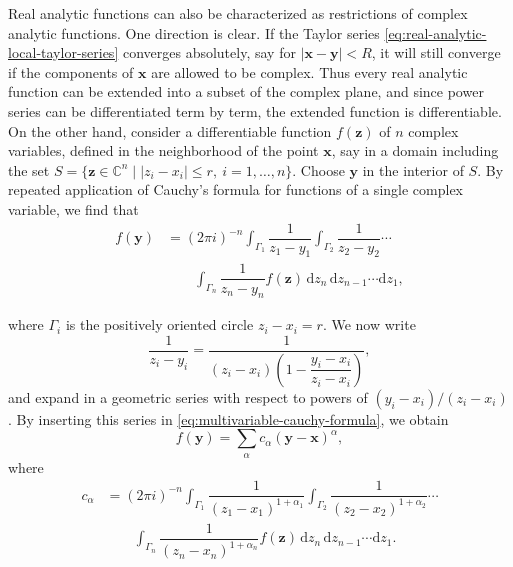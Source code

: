 Real analytic functions can also be characterized as restrictions of complex analytic functions. One direction is clear. If the Taylor series \eqref{eq:real-analytic-local-taylor-series} converges absolutely, say for $|\bm{x}-\bm{y}|<R$, it will still converge if the components of $\bm{x}$ are allowed to be complex. Thus every real analytic function can be extended into a subset of the complex plane, and since power series can be differentiated term by term, the extended function is differentiable. On the other hand, consider a differentiable function $f(\bm{z})$ of $n$ complex variables, defined in the neighborhood of the point $\bm{x}$, say in a domain including the set $S=\{\bm{z}\in\mathbb{C}^n\mid |z_i-x_i|\leq r,\ i=1,\ldots,n\}$. Choose $\bm{y}$ in the interior of $S$. By repeated application of Cauchy's formula for functions of a single complex variable, we find that
\begin{equation}\label{eq:multivariable-cauchy-formula}
\begin{aligned}
f(\bm{y})&=(2\pi i)^{-n}\int_{\Gamma_1}\dfrac1{z_1-y_1}\int_{\Gamma_2}\dfrac1{z_2-y_2}\cdots\\
&\qquad\int_{\Gamma_n}\dfrac1{z_n-y_n}f(\bm{z})\,\mathrm{d}z_n\,\mathrm{d}z_{n-1}\cdots\mathrm{d}z_1,
\end{aligned}
\end{equation}


where $\Gamma_i$ is the positively oriented circle $z_i-x_i=r$. We now write
\begin{equation}\label{eq:cauchy-kernel-geometric-factorization}
\dfrac1{z_i-y_i}=\dfrac1{(z_i-x_i)\left(1-\dfrac{y_i-x_i}{z_i-x_i}\right)},
\end{equation}
and expand in a geometric series with respect to powers of $(y_i-x_i)/(z_i-x_i)$. By inserting this series in \eqref{eq:multivariable-cauchy-formula}, we obtain
\begin{equation}\label{eq:complex-restriction-taylor-series}
f(\bm{y})=\sum_\alpha c_\alpha(\bm{y}-\bm{x})^\alpha,
\end{equation}
where
\begin{equation}\label{eq:complex-restriction-taylor-coefficients}
\begin{aligned}
c_\alpha&=(2\pi i)^{-n}\int_{\Gamma_1}\dfrac1{(z_1-x_1)^{1+\alpha_1}}\int_{\Gamma_2}\dfrac1{(z_2-x_2)^{1+\alpha_2}}\cdots\\
&\qquad\int_{\Gamma_n}\dfrac1{(z_n-x_n)^{1+\alpha_n}}f(\bm{z})\,\mathrm{d}z_n\,\mathrm{d}z_{n-1}\cdots\mathrm{d}z_1.
\end{aligned}
\end{equation}


